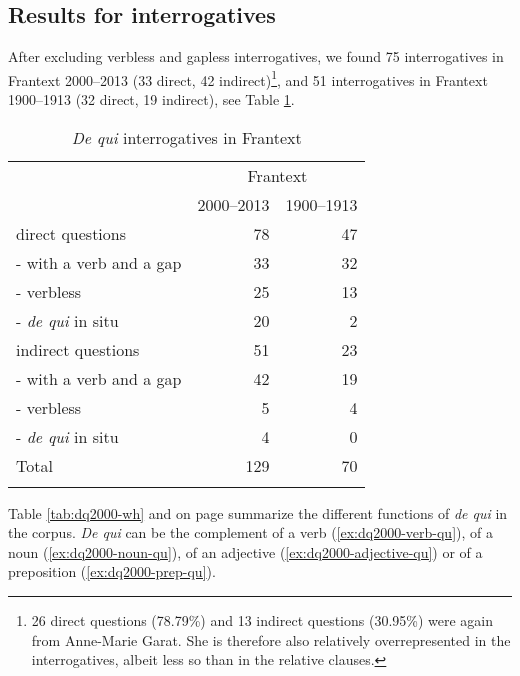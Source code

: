 \subsection{Results for interrogatives}

After excluding verbless and gapless interrogatives, we found 75 interrogatives in Frantext 2000--2013 (33 direct, 42 indirect)\footnote{26 direct questions (78.79\%) and 13 indirect questions (30.95\%) were again from Anne-Marie Garat. She is therefore also relatively overrepresented in the interrogatives, albeit less so than in the relative clauses.}, and 51 interrogatives in Frantext 1900--1913 (32 direct, 19 indirect), see Table \ref{tab:dequi-wh}.

\begin{table}
    \begin{tabular}{lrr}
         \lsptoprule
         & \multicolumn{2}{c}{Frantext}\\\cmidrule(lr){2-3}
         & \multicolumn{1}{c}{2000--2013} & \multicolumn{1}{c}{1900--1913} \\
         \midrule
         direct questions        & 78 & 47 \\
         \quad - with a verb and a gap & 33  & 32  \\
         \quad - verbless & 25  & 13  \\
         \quad - \emph{de qui} in situ & 20  & 2  \\
         indirect questions & 51 & 23 \\
         \quad - with a verb and a gap & 42  & 19  \\
         \quad - verbless & 5  & 4  \\
         \quad - \emph{de qui} in situ & 4  & 0  \\
         Total & 129 & 70 \\
         \lspbottomrule
    \end{tabular}
    \caption{\emph{De qui} interrogatives in Frantext}
    \label{tab:dequi-wh}
\end{table}

Table \ref{tab:dq2000-wh} and  on page \pageref{fig:dequi-d2000+1900-wh} summarize the different functions of \emph{de qui} in the corpus. \emph{De qui} can be the complement of a verb (\ref{ex:dq2000-verb-qu}), of a noun (\ref{ex:dq2000-noun-qu}), of an adjective (\ref{ex:dq2000-adjective-qu}) or of a preposition (\ref{ex:dq2000-prep-qu}). 

